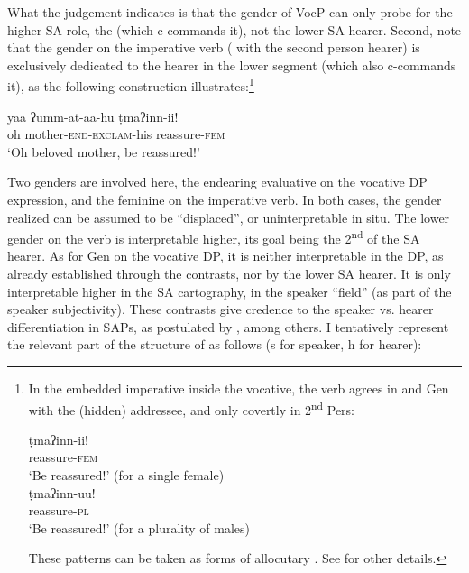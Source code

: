 \begin{exe}
\end{exe}

What the judgement indicates is that the gender of VocP can only probe for the
higher SA role, the  (which c-commands it), not the lower SA hearer.
Second, note that the gender on the imperative verb ( with the second
person hearer) is exclusively dedicated to the hearer in the lower segment
(which also c-commands it), as the following construction
illustrates:\footnote{In the embedded imperative inside the vocative, the verb
agrees in  and Gen with the (hidden) addressee, and only covertly in
2\textsuperscript{nd} Pers:

\begin{exe}
  \gll \d{t}maʔinn-ii!\\
  reassure-\textsc{fem}\\
  \glt `Be reassured!' (for a single female)\\
  \gll \d{t}maʔinn-uu!\\
  reassure-\textsc{pl}\\
  \glt `Be reassured!' (for a plurality of males)\\
\end{exe}

  These patterns can be taken as forms of allocutary  \citep[as in][]{Miyagawa2012}. See  \citet{FassiFehri2016} for other details.}

\begin{exe}
  \ex\label{ex:fassi:48}
  \gll yaa ʔumm-at-aa-hu \d{t}maʔinn-ii!\\
  oh mother-\textsc{end-exclam}-his reassure-\textsc{fem}\\
  \glt `Oh beloved mother, be reassured!'\\
\end{exe}

Two genders are involved here, the endearing evaluative  on the
vocative DP expression, and the feminine  on the imperative verb. In
both cases, the gender realized can be assumed to be ``displaced'', or
uninterpretable in situ. The lower gender on the verb is interpretable higher,
its goal being the 2\textsuperscript{nd}  of the SA hearer. As for Gen on
the vocative DP, it is neither interpretable in the DP, as already established
through the  contrasts, nor by the lower SA hearer. It is only
interpretable higher in the SA cartography, in the speaker ``field'' (as part of
the speaker subjectivity). These contrasts give credence to the speaker vs.
hearer differentiation in SAPs, as postulated by \citet{Hill2014}, among
others. I tentatively represent the relevant part of the structure of
 as follows (s for speaker, h for hearer):

